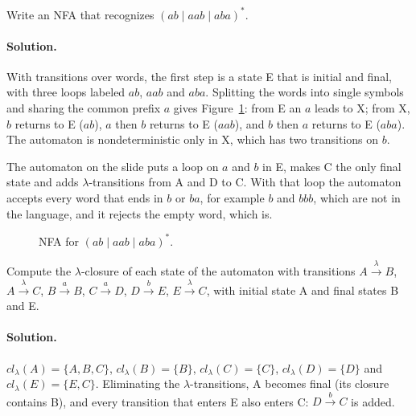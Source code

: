\begin{exercise}
Write an NFA that recognizes $(ab \mid aab \mid aba)^*$.
\end{exercise}

\paragraph{Solution.} With transitions over words, the first step is a state E
that is initial and final, with three loops labeled $ab$, $aab$ and $aba$.
Splitting the words into single symbols and sharing the common prefix $a$
gives Figure~\ref{fig:abstar}: from E an $a$ leads to X; from X, $b$ returns
to E ($ab$), $a$ then $b$ returns to E ($aab$), and $b$ then $a$ returns to E
($aba$). The automaton is nondeterministic only in X, which has two
transitions on $b$.

The automaton on the slide puts a loop on $a$ and $b$ in E, makes C the only
final state and adds $\lambda$-transitions from A and D to C. With that loop the
automaton accepts every word that ends in $b$ or $ba$, for example $b$ and
$bbb$, which are not in the language, and it rejects the empty word, which is.

\begin{figure}[h]
\centering
{}
\caption{NFA for $(ab \mid aab \mid aba)^*$.}
\label{fig:abstar}
\end{figure}


\begin{exercise}
Compute the $\lambda$-closure of each state of the automaton with transitions
$A \xrightarrow{\lambda} B$, $A \xrightarrow{\lambda} C$, $B \xrightarrow{a} B$,
$C \xrightarrow{a} D$, $D \xrightarrow{b} E$, $E \xrightarrow{\lambda} C$, with
initial state A and final states B and E.
\end{exercise}

\paragraph{Solution.} $\mathit{cl}_\lambda(A) = \{A, B, C\}$,
$\mathit{cl}_\lambda(B) = \{B\}$, $\mathit{cl}_\lambda(C) = \{C\}$,
$\mathit{cl}_\lambda(D) = \{D\}$ and $\mathit{cl}_\lambda(E) = \{E, C\}$. Eliminating
the $\lambda$-transitions, A becomes final (its closure contains B), and every
transition that enters E also enters C: $D \xrightarrow{b} C$ is added.

